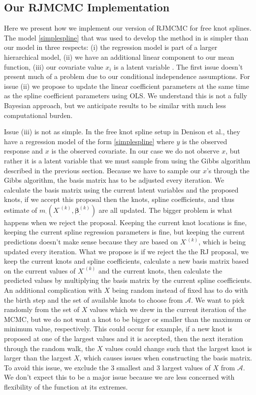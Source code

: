 \documentclass[11pt]{article}\usepackage[]{graphicx}\usepackage[]{color}
\begin{document}
\subsection{Our RJMCMC Implementation}

Here we present how we implement our version of RJMCMC for free knot splines. The model \eqref{simplespline} that was used to develop the method in \cite{denison} is simpler than our model in three respects: (i) the regression model is part of a larger hierarchical model, (ii) we have an additional linear component to our mean function, (iii) our covariate value $x_i$ is a latent variable . The first issue doesn't present much of a problem due to our conditional independence assumptions. For issue (ii) we propose to update the linear coefficient parameters at the same time as the spline coefficient parameters using OLS. We understand this is not a fully Bayesian approach, but we anticipate results to be similar with much less computational burden.

Issue (iii) is not as simple. In the free knot spline setup in Denison et al., they have a regression model of the form \eqref{simplespline} where $y$ is the observed response and $x$ is the observed covariate. In our case we do not observe $x$, but rather it is a latent variable that we must sample from using the Gibbs algorithm described in the previous section. Because we have to sample our $x$'s through the Gibbs algorithm, the basis matrix has to be adjusted every iteration. We calculate the basis matrix using the current latent variables and  the proposed knots, if we accept this proposal then the knots, spline coefficients, and thus estimate of $m_{\cdot}(X^{\cdot (k)},\boldsymbol{\beta}_{\cdot}^{(k)})$ are all updated. The bigger problem is what happens when we reject the proposal. Keeping the current knot locations is fine, keeping the current spline regression parameters is fine, but keeping the current predictions doesn't make sense because they are based on $X^{\cdot (k)}$, which is being updated every iteration. What we propose is if we reject the the RJ proposal, we keep the current knots and spline coefficients, calculate a new basis matrix based on the current values of $X^{\cdot (k)}$ and the current knots, then calculate the predicted values by multiplying the basis matrix by the current spline coefficients. An additional complication with $X$ being random instead of fixed has to do with the birth step and the set of available knots to choose from $\mathcal{A}$. We want to pick randomly from the set of $X$ values which we drew in the current iteration of the MCMC, but we do not want a knot to be bigger or smaller than the maximum or minimum value, respectively. This could occur for example, if a new knot is proposed at one of the largest values and it is accepted, then the next iteration through the random walk, the $X$ values could change such that the largest knot is larger than the largest $X$, which causes issues when constructing the basis matrix. To avoid this issue, we exclude the 3 smallest and 3 largest values of $X$ from $\mathcal{A}$. We don't expect this to be a major issue because we are less concerned with flexibility of the function at its extremes.
\end{document}
